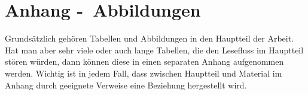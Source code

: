 
\clearpage
\chapter{Anhang -\ Abbildungen}

Grundsätzlich gehören Tabellen und Abbildungen in den Hauptteil der Arbeit.
Hat man aber sehr viele oder auch lange Tabellen, die den Lesefluss im Hauptteil
stören würden, dann können diese in einen separaten Anhang aufgenommen werden.
Wichtig ist in jedem Fall, dass zwischen Hauptteil und Material im Anhang durch
geeignete Verweise eine Beziehung hergestellt wird.
